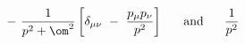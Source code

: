 \begin{equation}
-~ \frac{1}{p^{2}+\om^{2}} \left[ \delta_{\mu\nu} ~-~ \frac{p_\mu
p_\nu}{p^{2}} \right] ~~~~~ \mbox{and} ~~~~~ \frac{1}{p^{2}}
\end{equation}

